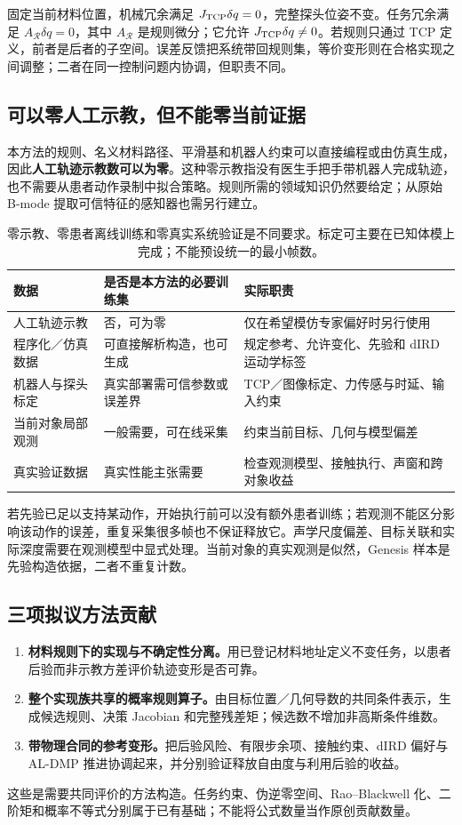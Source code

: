 \documentclass[UTF8,11pt,a4paper,fontset=fandol]{ctexart}
\numberwithin{equation}{section}
\theoremstyle{definition}
\begin{document}
固定当前材料位置，机械冗余满足 $J_{\rm TCP}\delta q=0$，完整探头位姿不变。任务冗余满足 $A_{\mathcal R}\delta q=0$，其中 $A_{\mathcal R}$ 是规则微分；它允许 $J_{\rm TCP}\delta q\ne0$。若规则只通过 TCP 定义，前者是后者的子空间。误差反馈把系统带回规则集，等价变形则在合格实现之间调整；二者在同一控制问题内协调，但职责不同。

\subsection{可以零人工示教，但不能零当前证据}
本方法的规则、名义材料路径、平滑基和机器人约束可以直接编程或由仿真生成，因此\textbf{人工轨迹示教数可以为零}。这种零示教指没有医生手把手带机器人完成轨迹，也不需要从患者动作录制中拟合策略。规则所需的领域知识仍然要给定；从原始 B-mode 提取可信特征的感知器也需另行建立。

\begin{table}[ht]\centering\small
\begin{tabularx}{\linewidth}{p{.20\linewidth}YY}
\toprule
数据 & 是否是本方法的必要训练集 & 实际职责\\\midrule
人工轨迹示教 & 否，可为零 & 仅在希望模仿专家偏好时另行使用\\
程序化／仿真数据 & 可直接解析构造，也可生成 & 规定参考、允许变化、先验和 dIRD 运动学标签\\
机器人与探头标定 & 真实部署需可信参数或误差界 & TCP／图像标定、力传感与时延、输入约束\\
当前对象局部观测 & 一般需要，可在线采集 & 约束当前目标、几何与模型偏差\\
真实验证数据 & 真实性能主张需要 & 检查观测模型、接触执行、声窗和跨对象收益\\
\bottomrule
\end{tabularx}
\caption{零示教、零患者离线训练和零真实系统验证是不同要求。标定可主要在已知体模上完成；不能预设统一的最小帧数。}
\end{table}

若先验已足以支持某动作，开始执行前可以没有额外患者训练；若观测不能区分影响该动作的误差，重复采集很多帧也不保证释放它。声学尺度偏差、目标关联和实际深度需要在观测模型中显式处理。当前对象的真实观测是似然，Genesis 样本是先验构造依据，二者不重复计数。

\subsection{三项拟议方法贡献}
\begin{enumerate}
\item \textbf{材料规则下的实现与不确定性分离。}用已登记材料地址定义不变任务，以患者后验而非示教方差评价轨迹变形是否可靠。
\item \textbf{整个实现族共享的概率规则算子。}由目标位置／几何导数的共同条件表示，生成候选规则、决策 Jacobian 和完整残差矩；候选数不增加非高斯条件维数。
\item \textbf{带物理合同的参考变形。}把后验风险、有限步余项、接触约束、dIRD 偏好与 AL-DMP 推进协调起来，并分别验证释放自由度与利用后验的收益。
\end{enumerate}
这些是需要共同评价的方法构造。任务约束、伪逆零空间、Rao--Blackwell 化、二阶矩和概率不等式分别属于已有基础；不能将公式数量当作原创贡献数量。
\end{document}
